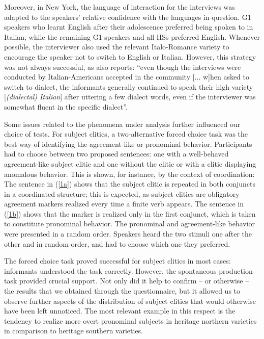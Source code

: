 \documentclass[output=paper,hidelinks]{langscibook}
\begin{document}
Moreover, in New York, the language of interaction for the interviews was adapted to the speakers’ relative confidence with the languages in question. G1 speakers who learnt English after their adolescence preferred being spoken to in Italian, while the remaining G1 speakers and all HSs preferred English. Whenever possible, the interviewer also used the relevant Italo-Romance variety to encourage the speaker not to switch to English or Italian. However, this strategy was not always successful, as \citet[394]{Haller1987} also reports: ``even though the interviews were conducted by Italian-Americans accepted in the community [... w]hen asked to switch to dialect, the informants generally continued to speak their high variety [\textit{(dialectal) Italian}] after uttering a few dialect words, even if the interviewer was somewhat fluent in the specific dialect''.

Some issues related to the phenomena under analysis further influenced our choice of tests. For subject clitics, a two-alternative forced choice task was the best way of identifying the agree\-ment-like or pronominal behavior. Participants had to choose between two proposed sentences: one with a well-behaved agree\-ment-like subject clitic and one without the clitic or with a clitic displaying anomalous behavior. This is shown, for instance, by the context of coordination:
\ea
{}\\
\z \z
The sentence in (\ref{1a}) shows that the subject clitic is repeated in both conjuncts in a coordinated structure; this is expected, as subject clitics are obligatory agreement markers realized every time a finite verb appears. The sentence in (\ref{1b}) shows that the marker is realized only in the first conjunct, which is taken to constitute pronominal behavior. The pronominal and agreement-like behavior were presented in a random order. Speakers heard the two stimuli one after the other and in random order, and had to choose which one they preferred.

The forced choice task proved successful for subject clitics in most cases: informants understood the task correctly. However, the spontaneous production task provided crucial support. Not only did it help to confirm -- or otherwise -- the results that we obtained through the questionnaire, but it allowed us to observe further aspects of the distribution of subject clitics that would otherwise have been left unnoticed. The most relevant example in this respect is the tendency to realize more overt pronominal subjects in heritage northern varieties in comparison to heritage southern varieties.
\end{document}
